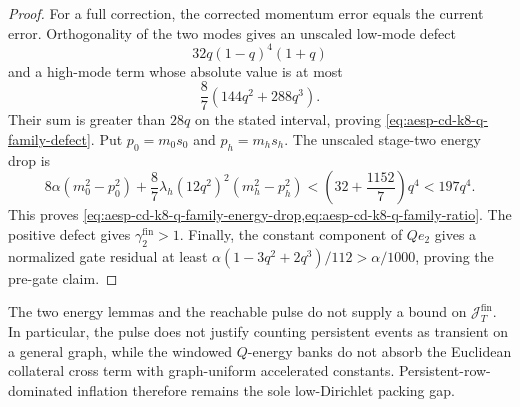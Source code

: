 \begin{proof}
For a full correction, the corrected momentum error equals the current
error.  Orthogonality of the two modes gives an unscaled low-mode defect
\begin{equation*}
 32q(1-q)^4(1+q)
\end{equation*}
and a high-mode term whose absolute value is at most
\begin{equation*}
 \frac87(144q^2+288q^3).
\end{equation*}
Their sum is greater than $28q$ on the stated interval, proving
\cref{eq:aesp-cd-k8-q-family-defect}.  Put $p_0=m_0s_0$ and
$p_h=m_hs_h$.  The unscaled stage-two energy drop is
\begin{equation*}
 8\alpha(m_0^2-p_0^2)
 +\frac87\lambda_h(12q^2)^2(m_h^2-p_h^2)
 <\left(32+\frac{1152}{7}\right)q^4<197q^4.
\end{equation*}
This proves
\cref{eq:aesp-cd-k8-q-family-energy-drop,eq:aesp-cd-k8-q-family-ratio}.
The positive defect gives $\gamma_2^{\mathrm{fin}}>1$.  Finally, the
constant component of $Qe_2$ gives a normalized gate residual at least
$\alpha(1-3q^2+2q^3)/112>\alpha/1000$, proving the pre-gate claim.
\end{proof}

The two energy lemmas and the reachable pulse do not supply a bound on
$\mathcal J_T^{\mathrm{fin}}$.  In particular, the pulse does not justify
counting persistent events as transient on a general graph, while the
windowed $Q$-energy banks do not absorb the Euclidean collateral cross term
with graph-uniform accelerated constants.  Persistent-row-dominated
inflation therefore remains the sole low-Dirichlet packing gap.

